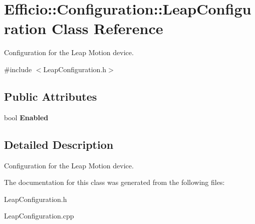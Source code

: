 \hypertarget{class_efficio_1_1_configuration_1_1_leap_configuration}{}\section{Efficio\+:\+:Configuration\+:\+:Leap\+Configuration Class Reference}
\label{class_efficio_1_1_configuration_1_1_leap_configuration}


Configuration for the Leap Motion device.  




{\ttfamily \#include $<$Leap\+Configuration.\+h$>$}

\subsection*{Public Attributes}
\begin{DoxyCompactItemize}
\item 
\hypertarget{class_efficio_1_1_configuration_1_1_leap_configuration_a237eb567a1666e71d13e93bb2e9d86a9}{}\label{class_efficio_1_1_configuration_1_1_leap_configuration_a237eb567a1666e71d13e93bb2e9d86a9} 
bool {\bfseries Enabled}
\end{DoxyCompactItemize}


\subsection{Detailed Description}
Configuration for the Leap Motion device. 

The documentation for this class was generated from the following files\+:\begin{DoxyCompactItemize}
\item 
Leap\+Configuration.\+h\item 
Leap\+Configuration.\+cpp\end{DoxyCompactItemize}
